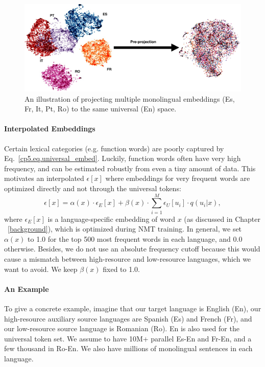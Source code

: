 \begin{figure}[hptb]
	\centering
	\includegraphics[width=\linewidth]{figs/ulr/preprojection}
      \caption{\label{cp5.fig.preproj} An illustration of projecting multiple monolingual embeddings (Es, Fr, It, Pt, Ro) to the same universal (En) space.}
  \end{figure}


\paragraph{Interpolated Embeddings}
Certain lexical categories (e.g. function words) are poorly captured by Eq.~\eqref{cp5.eq.universal_embed}. Luckily, function words often have very high frequency, and can be estimated robustly from even a tiny amount of data. This motivates an interpolated $\epsilon[x]$ where embeddings for very frequent words are optimized directly and  not through the universal tokens:
\begin{equation}
	\epsilon[x] = \alpha(x) \cdot \epsilon_E[x] + \beta(x) \cdot \sum_{i=1}^M \epsilon_U[u_i] \cdot q(u_i|x),
\end{equation}
where $\epsilon_E[x]$ is a language-specific embedding of word $x$ (as discussed in Chapter ~\ref{background}), which is optimized during NMT training. In general, we set $\alpha(x)$ to 1.0 for the top 500 most frequent words in each language, and 0.0 otherwise. Besides, we do not use an absolute frequency cutoff because this would cause a mismatch between high-resource and low-resource languages, which we want to avoid. We keep $\beta(x)$ fixed to 1.0.

\paragraph{An Example} To give a concrete example, imagine that our target language is English (En), our high-resource auxiliary source languages are Spanish (Es) and French (Fr), and our low-resource source language is Romanian (Ro). En is also used for the universal token set. We assume to have 10M+ parallel Es-En and Fr-En, and a few thousand in Ro-En. We also have millions of monolingual sentences in each language.

